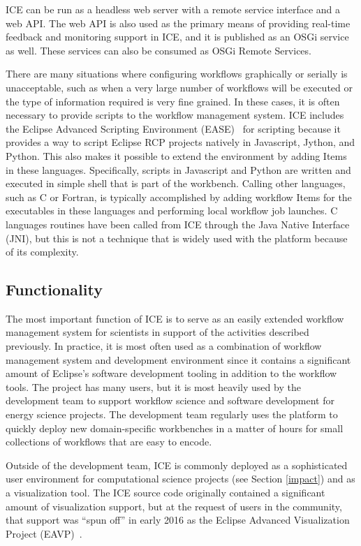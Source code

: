 ICE can be run as a headless web server with a remote service interface and a web
API. The web API is also used as the primary means of providing real-time 
feedback and monitoring support in ICE, and it is published as an OSGi service as well. These services can also be consumed as OSGi Remote Services.

There are many situations where configuring workflows graphically or serially is
unacceptable, such as when a very large number of workflows will be
executed or the type of information required is very fine grained. In
these cases, it is often necessary to provide scripts to the workflow
management system. ICE includes the Eclipse Advanced Scripting
Environment (EASE)~\cite{pontesegger_eclipse_2015} for scripting because it
provides a way to script Eclipse RCP projects natively in Javascript,
Jython, and Python. This also makes it possible to extend the
environment by adding Items in these languages. Specifically, scripts in Javascript and Python are written and executed in simple shell that is part of the workbench. Calling other languages, such as C or Fortran, is typically accomplished by adding workflow Items for the executables in these languages and performing local workflow job launches. C languages routines have been called from ICE through the Java Native Interface (JNI), but this is not a technique that is widely used with the platform because of its complexity.

\subsection{Functionality}\label{software-functionalities}

The most important function of ICE is to serve as an easily extended
workflow management system for scientists in support of
the activities described previously. In practice, it is most often used as a
combination of workflow management system and development environment
since it contains a significant amount of Eclipse's software development
tooling in addition to the workflow tools. The project has many users,
but it is most heavily used by the development team to support workflow
science and software development for energy science projects. The
development team regularly uses the platform to quickly deploy new
domain-specific workbenches in a matter of hours for small collections
of workflows that are easy to encode.

Outside of the development team, ICE is commonly deployed as a
sophisticated user environment for computational science projects 
(see Section \ref{impact}) and as a visualization tool. The ICE source code originally contained a
significant amount of visualization support, but at the request of users
in the community, that support was ``spun off'' in early 2016 as the 
Eclipse Advanced Visualization Project (EAVP)~\cite{billings_eclipse_2015}.

